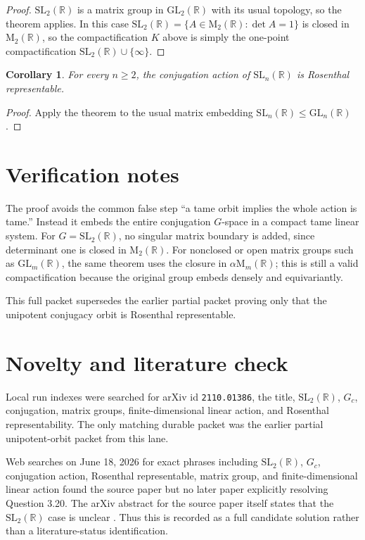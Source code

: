 \documentclass[11pt]{article}
\newtheorem{corollary}{Corollary}
\newcommand{\R}{\mathbb{R}}
\newcommand{\SL}{\mathrm{SL}}
\newcommand{\GL}{\mathrm{GL}}
\newcommand{\Mat}{\mathrm{M}}
\begin{document}
\begin{proof}
\(\SL_2(\R)\) is a matrix group in \(\GL_2(\R)\) with its usual
topology, so the theorem applies.  In this case
\(\SL_2(\R)=\{A\in\Mat_2(\R):\det A=1\}\) is closed in \(\Mat_2(\R)\),
so the compactification \(K\) above is simply the one-point
compactification \(\SL_2(\R)\cup\{\infty\}\).
\end{proof}

\begin{corollary}
For every \(n\geq 2\), the conjugation action of \(\SL_n(\R)\) is
Rosenthal representable.
\end{corollary}

\begin{proof}
Apply the theorem to the usual matrix embedding
\(\SL_n(\R)\leq \GL_n(\R)\).
\end{proof}

\section*{Verification notes}

The proof avoids the common false step ``a tame orbit implies the whole
action is tame.''  Instead it embeds the entire conjugation \(G\)-space
in a compact tame linear system.  For \(G=\SL_2(\R)\), no singular
matrix boundary is added, since determinant one is closed in
\(\Mat_2(\R)\).  For nonclosed or open matrix groups such as
\(\GL_m(\R)\), the same theorem uses the closure in
\(\alpha\Mat_m(\R)\); this is still a valid compactification because
the original group embeds densely and equivariantly.

This full packet supersedes the earlier partial packet proving only
that the unipotent conjugacy orbit is Rosenthal representable.

\section*{Novelty and literature check}

Local run indexes were searched for arXiv id \texttt{2110.01386}, the
title, \(\SL_2(\R)\), \(G_c\), conjugation, matrix groups,
finite-dimensional linear action, and Rosenthal representability.  The
only matching durable packet was the earlier partial unipotent-orbit
packet from this lane.

Web searches on June 18, 2026 for exact phrases including
\(\SL_2(\R)\), \(G_c\), conjugation action, Rosenthal representable,
matrix group, and finite-dimensional linear action found the source
paper but no later paper explicitly resolving Question 3.20.  The arXiv
abstract for the source paper itself states that the \(\SL_2(\R)\)
case is unclear \cite{arxivPage}.  Thus this is recorded as a full
candidate solution rather than a literature-status identification.
\end{document}
